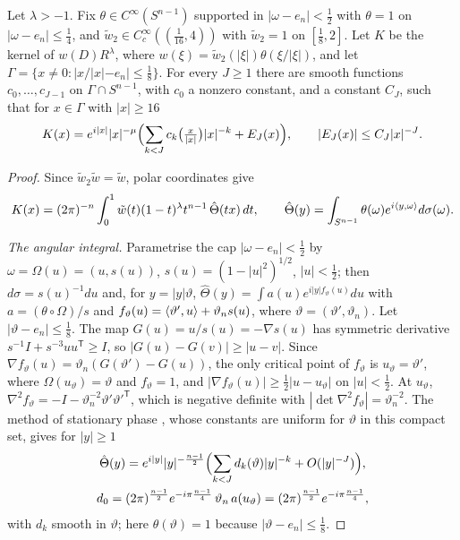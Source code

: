 \begin{lemma}\label{lem:kernelasym}
Let $\lambda>-1$. Fix $\theta\in C^\infty(S^{n-1})$ supported in $|\omega-e_n|<\frac12$ with $\theta=1$ on
$|\omega-e_n|\le\frac14$, and $\tilde w_2\in C^\infty_c((\frac1{16},4))$ with $\tilde w_2=1$ on $[\frac18,2]$. Let $K$ be
the kernel of $w(D)R^\lambda$, where $w(\xi)=\tilde w_2(|\xi|)\theta(\xi/|\xi|)$, and let
$\Gamma=\{x\ne0:|x/|x|-e_n|\le\frac18\}$. For every $J\ge1$ there are smooth functions $c_0,\dots,c_{J-1}$ on
$\Gamma\cap S^{n-1}$, with $c_0$ a nonzero constant, and a constant $C_J$, such that for $x\in\Gamma$ with
$|x|\ge16$
\[
K(x)=e^{i|x|}|x|^{-\mu}\Bigl(\sum_{k<J}c_k\bigl(\tfrac x{|x|}\bigr)|x|^{-k}+E_J(x)\Bigr),\qquad |E_J(x)|\le C_J|x|^{-J}.
\]
\end{lemma}

\begin{proof}
Since $\tilde w_2\tilde w=\tilde w$, polar coordinates give
\[
K(x)=(2\pi)^{-n}\int_0^1\tilde w(t)(1-t)^\lambda t^{n-1}\,\hat\Theta(tx)\,dt,\qquad
\hat\Theta(y)=\int_{S^{n-1}}\theta(\omega)e^{i\langle y,\omega\rangle}d\sigma(\omega).
\]

\emph{The angular integral.} Parametrise the cap $|\omega-e_n|<\frac12$ by $\omega=\Omega(u)=(u,s(u))$,
$s(u)=(1-|u|^2)^{1/2}$, $|u|<\frac12$; then $d\sigma=s(u)^{-1}du$ and, for $y=|y|\vartheta$,
$\hat\Theta(y)=\int a(u)e^{i|y|f_\vartheta(u)}du$ with $a=(\theta\circ\Omega)/s$ and
$f_\vartheta(u)=\langle \vartheta',u\rangle+\vartheta_ns(u)$, where $\vartheta=(\vartheta',\vartheta_n)$. Let $|\vartheta-e_n|\le\frac18$. The
map $G(u)=u/s(u)=-\nabla s(u)$ has symmetric derivative $s^{-1}I+s^{-3}uu^{\mathsf T}\ge I$, so
$|G(u)-G(v)|\ge|u-v|$. Since $\nabla f_\vartheta(u)=\vartheta_n(G(\vartheta')-G(u))$, the only critical point of $f_\vartheta$ is
$u_\vartheta=\vartheta'$, where $\Omega(u_\vartheta)=\vartheta$ and $f_\vartheta=1$, and
$|\nabla f_\vartheta(u)|\ge\frac12|u-u_\vartheta|$ on $|u|<\frac12$. At $u_\vartheta$,
$\nabla^2f_\vartheta=-I-\vartheta_n^{-2}\vartheta'\vartheta'^{\mathsf T}$, which is negative definite with
$|\det\nabla^2f_\vartheta|=\vartheta_n^{-2}$. The method of stationary phase \cite[Theorem 7.7.5]{Hor}, whose
constants are uniform for $\vartheta$ in this compact set, gives for $|y|\ge1$
\begin{gather*}
\hat\Theta(y)=e^{i|y|}|y|^{-\frac{n-1}2}\Bigl(\sum_{k<J}d_k(\vartheta)|y|^{-k}+O(|y|^{-J})\Bigr),\\
d_0=(2\pi)^{\frac{n-1}2}e^{-i\pi\frac{n-1}4}\,\vartheta_n\,a(u_\vartheta)=(2\pi)^{\frac{n-1}2}e^{-i\pi\frac{n-1}4},
\end{gather*}
with $d_k$ smooth in $\vartheta$; here $\theta(\vartheta)=1$ because $|\vartheta-e_n|\le\frac18$.


\end{proof}
